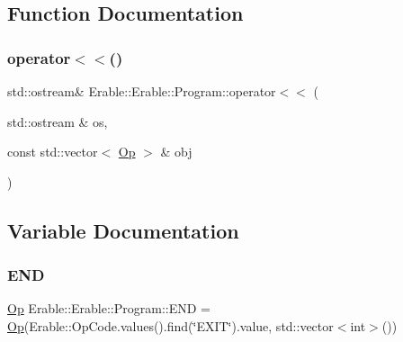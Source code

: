 \subsection{Function Documentation}
\mbox{\label{namespace_erable_1_1_erable_1_1_program_a8f715de10e3b305a485ae55c84b42f28}} 
\subsubsection{\texorpdfstring{operator$<$$<$()}{operator<<()}}
{\footnotesize\ttfamily std\+::ostream\& Erable\+::\+Erable\+::\+Program\+::operator$<$$<$ (\begin{DoxyParamCaption}\item[{std\+::ostream \&}]{os,  }\item[{const std\+::vector$<$ \mbox{\hyperlink{struct_erable_1_1_erable_1_1_program_1_1_op}{Op}} $>$ \&}]{obj }\end{DoxyParamCaption})}



\subsection{Variable Documentation}
\mbox{\label{namespace_erable_1_1_erable_1_1_program_aacdae80b635eff00faebbfcada20d503}} 
\subsubsection{\texorpdfstring{END}{END}}
{\footnotesize\ttfamily \mbox{\hyperlink{struct_erable_1_1_erable_1_1_program_1_1_op}{Op}} Erable\+::\+Erable\+::\+Program\+::\+E\+ND = \mbox{\hyperlink{struct_erable_1_1_erable_1_1_program_1_1_op}{Op}}(Erable\+::\+Op\+Code.\+values().find(\char`\"{}E\+X\+IT\char`\"{}).value, std\+::vector$<$int$>$())\hspace{0.3cm}{\ttfamily [inline]}}

\mbox{\label{namespace_erable_1_1_erable_1_1_program_a1b21e2b94fc7f93fe5d530904f72f746}} 
